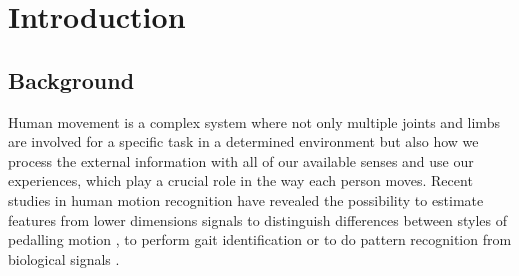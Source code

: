 
\chapter{Introduction}  %


\graphicspath{{figs/chapter1/PDF/}}

%


\section{Background}
Human movement is a complex system where not only multiple
joints and limbs are involved for a specific task in a determined environment
but also how we process the external information with all of our available senses 
and use our experiences, which play a crucial role in the way each person moves.
Recent studies in human motion recognition have revealed the possibility to estimate
features from lower dimensions signals to distinguish differences between 
styles of pedalling motion \cite{Quintana-Duque2012, Quintana-Duque2016}, 
to perform gait identification \cite{sama2013, frank2010} 
or to do pattern recognition from biological signals \cite{gomezgarcia2014}.

